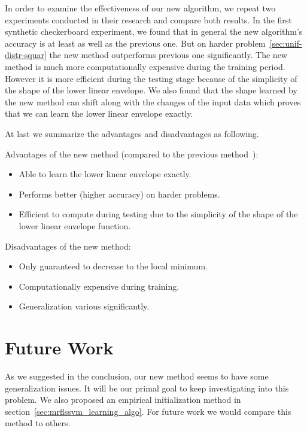 In order to examine the effectiveness of our new algorithm, we
repeat two experiments  conducted in
their research and compare both results. In the first synthetic
checkerboard experiment, we found that in general the new
algorithm's accuracy is at least as well as the previous one. But
on harder problem~\ref{sec:unif-distr-squar} the new method
outperforms previous one significantly. The new method is much
more computationally expensive during the training period.
However it is more efficient during the testing stage because of
the simplicity of the shape of the lower linear envelope. We also
found that the shape learned by the new method can shift along
with the changes of the input data which proves that we can learn
the lower linear envelope exactly.

At last we summarize the advantages and disadvantages as
following.

\bigskip

Advantages of the new method (compared to the previous
method~\cite{gouldlearning,Gould:ICML2011}):

\begin{itemize}
\item Able to learn the lower linear envelope exactly.
\item Performs better (higher accuracy) on harder problems.
\item Efficient to compute during testing due to the simplicity
  of the shape of the lower linear envelope function.
\end{itemize}

Disadvantages of the new method:

\begin{itemize}
\item Only guaranteed to decrease to the local minimum.
\item Computationally expensive during training.
\item Generalization various significantly.
\end{itemize}


\section{Future Work}
\label{sec:futurework}

As we suggested in the conclusion, our new method seems to have
some generalization issues. It will be our primal goal to keep
investigating into this problem. We also proposed an empirical
initialization method in
section~\ref{sec:mrflssvm_learning_algo}. For future work we
would compare this method to others.

